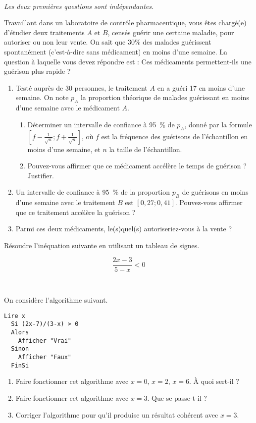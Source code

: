 \documentclass[12pt]{article}
\begin{document}
\begin{exercice}~

  \noindent\emph{Les deux premières questions sont indépendantes.}

  Travaillant dans un laboratoire de contrôle pharmaceutique, vous êtes chargé(e) d'étudier deux traitements $A$ et $B$, censés guérir une certaine maladie, pour autoriser ou non leur vente. On sait que 30\% des malades guérissent spontanément (c'est-à-dire sans médicament) en moins d'une semaine. La question à laquelle vous devez répondre est : Ces médicaments permettent-ils une guérison plus rapide ?

  \begin{enumerate}
    \item Testé auprès de 30 personnes, le traitement $A$ en a guéri 17 en moins d'une semaine. On note $p_A$ la proportion théorique de malades guérissant en moins d'une semaine avec le médicament $A$.
      \begin{enumerate}
        \item Déterminer un intervalle de confiance à 95~\% de $p_A$, donné par la formule $\left[f-\frac{1}{\sqrt{n}};f+\frac{1}{\sqrt{n}}\right]$, où $f$ est la fréquence des guérisons de l'échantillon en moins d'une semaine, et $n$ la taille de l'échantillon.
        \item Pouvez-vous affirmer que ce médicament accélère le temps de guérison ? Justifier.
      \end{enumerate}
    \item Un intervalle de confiance à 95~\% de la proportion $p_B$ de guérisons en moins d'une semaine avec le traitement $B$ est $\left[0,27;0,41\right]$. Pouvez-vous affirmer que ce traitement accélère la guérison ?
    \item Parmi ces deux médicaments, le(s)quel(s) autoriseriez-vous à la vente ?
  \end{enumerate}
\end{exercice}

\begin{exercice}
  Résoudre l'inéquation suivante en utilisant un tableau de signes.

  \[\frac{2x-3}{5-x}<0\]
\end{exercice}

\begin{exercice}~

  On considère l'algorithme suivant.
  \begin{lstlisting}[language=naturel,frame=lines,mathescape=true]
  Lire x
  Si (2x-7)/(3-x) > 0
  Alors
    Afficher "Vrai"
  Sinon
    Afficher "Faux"
  FinSi
  \end{lstlisting}
  \begin{enumerate}
    \item Faire fonctionner cet algorithme avec $x=0$, $x=2$, $x=6$. À quoi sert-il ?
    \item Faire fonctionner cet algorithme avec $x=3$. Que se passe-t-il ?
    \item Corriger l'algorithme pour qu'il produise un résultat cohérent avec $x=3$.
  \end{enumerate}
\end{exercice}
\end{document}
